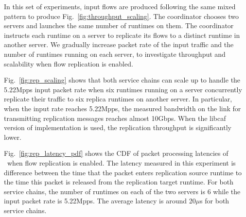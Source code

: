 \begin{table}[!h]
\centering
\caption{Recovery time and \# of flows recovered}
\vspace{-3mm}
\label{table:recover}
\vspace{-3mm}
\end{table}

In this set of experiments, input flows are produced following the same mixed pattern to produce Fig.~\ref{fig:throughput_scaling}. The coordinator chooses two servers and launches the same number of runtimes on them. The coordinator instructs each runtime on a server to replicate its flows to a distinct runtime in another server. We gradually increase packet rate of the input traffic and the number of runtimes running on each server, to investigate throughput and scalability when flow replication is enabled.

Fig.~\ref{fig:rep_scaling} shows that both service chains can scale up to handle the 5.22Mpps input packet rate when six runtimes running on a server concurrently replicate their traffic to six replica runtimes on another server. In particular, when the input rate reaches 5.22Mpps, the measured bandwidth on the link for transmitting replication messages reaches almost 10Gbps. When the libcaf version of implementation is used, the replication throughput is significantly lower.

Fig.~\ref{fig:rep_latency_pdf} shows the CDF of packet processing latencies of \nfactor~when flow replication is enabled. The latency measured in this experiment is difference between the time that the packet enters replication source runtime to the time this packet is released from the replication target runtime. For both service chains, the number of runtimes on each of the two servers is 6 while the input packet rate is 5.22Mpps. The average latency is around 20$\mu$s for both service chains.

